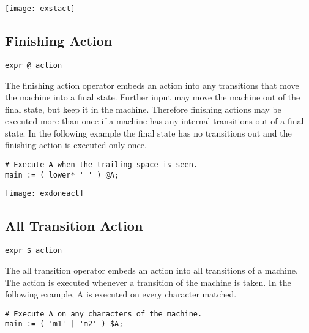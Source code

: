 \documentclass[letterpaper,11pt,oneside]{book}
\newcommand{\verbspace}{\vspace{10pt}}
\newcommand{\graphspace}{\vspace{10pt}}
\newenvironment{inline_code}{\def\baselinestretch{1}\vspace{12pt}\small}{}
\begin{document}
\graphspace
\begin{center}
\texttt{[image: exstact]}
\end{center}
\graphspace

\subsection{Finishing Action}

\verb|expr @ action|

The finishing action operator embeds an action into any transitions that move
the machine into a final state. Further input may move the machine out of the
final state, but keep it in the machine. Therefore finishing actions may be
executed more than once if a machine has any internal transitions out of a
final state. In the following example the final state has no transitions out
and the finishing action is executed only once.

\begin{inline_code}
\begin{verbatim}
# Execute A when the trailing space is seen.
main := ( lower* ' ' ) @A;
\end{verbatim}
\end{inline_code}
\verbspace
% }%%
% END GENERATE

\graphspace
\begin{center}
\texttt{[image: exdoneact]}
\end{center}
\graphspace

\subsection{All Transition Action}

\verb|expr $ action|

The all transition operator embeds an action into all transitions of a machine.
The action is executed whenever a transition of the machine is taken. In the
following example, A is executed on every character matched.

\begin{inline_code}
\begin{verbatim}
# Execute A on any characters of the machine.
main := ( 'm1' | 'm2' ) $A;
\end{verbatim}
\end{inline_code}
\verbspace
\end{document}
